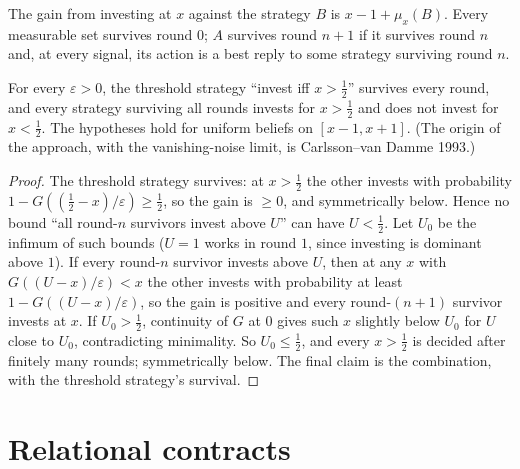 \begin{definition}
\label{def:global-survives}
\leanok
The gain from investing at $x$ against the strategy $B$ is $x - 1 + \mu_x(B)$. Every measurable set survives round $0$;
$A$ survives round $n+1$ if it survives round $n$ and, at every signal, its action is a best reply to some strategy
surviving round $n$.
\end{definition}

\begin{theorem}
\label{thm:global-games}
\leanok
{}
For every $\varepsilon > 0$, the threshold strategy ``invest iff $x > \tfrac12$'' survives every round, and every
strategy surviving all rounds invests for $x > \tfrac12$ and does not invest for $x < \tfrac12$. The hypotheses hold
for uniform beliefs on $[x - 1, x + 1]$. (The origin of the approach, with the vanishing-noise limit, is
Carlsson--van Damme 1993.)
\end{theorem}
\begin{proof}
\leanok
The threshold strategy survives: at $x > \tfrac12$ the other invests with probability
$1 - G((\tfrac12 - x)/\varepsilon) \ge \tfrac12$, so the gain is $\ge 0$, and symmetrically below.
Hence no bound ``all round-$n$ survivors invest above $U$'' can have $U < \tfrac12$. Let $U_0$ be the infimum of such
bounds ($U = 1$ works in round $1$, since investing is dominant above $1$). If every round-$n$ survivor invests above
$U$, then at any $x$ with $G((U - x)/\varepsilon) < x$ the other invests with probability at least
$1 - G((U - x)/\varepsilon)$, so the gain is positive and every round-$(n+1)$ survivor invests at $x$. If
$U_0 > \tfrac12$, continuity of $G$ at $0$ gives such $x$ slightly below $U_0$ for $U$ close to $U_0$, contradicting
minimality. So $U_0 \le \tfrac12$, and every $x > \tfrac12$ is decided after finitely many rounds; symmetrically
below. The final claim is the combination, with the threshold strategy's survival.
\end{proof}

\section{Relational contracts}

